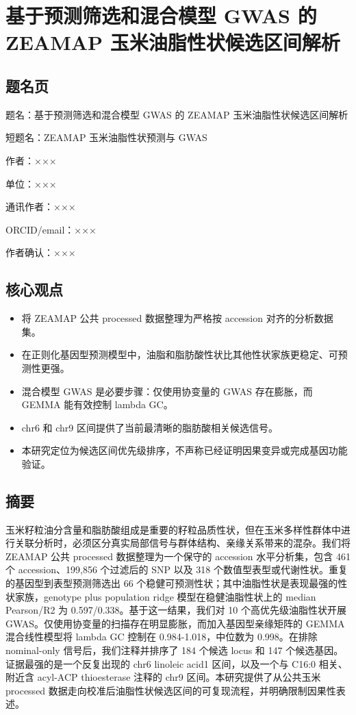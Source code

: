 \documentclass[
]{article}
\author{}
\date{}
\providecommand{\tightlist}{%
  \setlength{\itemsep}{0pt}\setlength{\parskip}{0pt}}
\begin{document}
\section{基于预测筛选和混合模型 GWAS 的 ZEAMAP
玉米油脂性状候选区间解析}\label{ux57faux4e8eux9884ux6d4bux7b5bux9009ux548cux6df7ux5408ux6a21ux578b-gwas-ux7684-zeamap-ux7389ux7c73ux6cb9ux8102ux6027ux72b6ux5019ux9009ux533aux95f4ux89e3ux6790}

\subsection{题名页}\label{ux9898ux540dux9875}

题名：基于预测筛选和混合模型 GWAS 的 ZEAMAP 玉米油脂性状候选区间解析

短题名：ZEAMAP 玉米油脂性状预测与 GWAS

作者：×××

单位：×××

通讯作者：×××

ORCID/email：×××

作者确认：×××

\subsection{核心观点}\label{ux6838ux5fc3ux89c2ux70b9}

\begin{itemize}
\tightlist
\item
  将 ZEAMAP 公共 processed 数据整理为严格按 accession 对齐的分析数据集。
\item
  在正则化基因型预测模型中，油脂和脂肪酸性状比其他性状家族更稳定、可预测性更强。
\item
  混合模型 GWAS 是必要步骤：仅使用协变量的 GWAS 存在膨胀，而 GEMMA
  能有效控制 lambda GC。
\item
  chr6 和 chr9 区间提供了当前最清晰的脂肪酸相关候选信号。
\item
  本研究定位为候选区间优先级排序，不声称已经证明因果变异或完成基因功能验证。
\end{itemize}

\subsection{摘要}\label{ux6458ux8981}

玉米籽粒油分含量和脂肪酸组成是重要的籽粒品质性状，但在玉米多样性群体中进行关联分析时，必须区分真实局部信号与群体结构、亲缘关系带来的混杂。我们将
ZEAMAP 公共 processed 数据整理为一个保守的 accession 水平分析集，包含
461 个 accession、199,856 个过滤后的 SNP 以及 318
个数值型表型或代谢性状。重复的基因型到表型预测筛选出 66
个稳健可预测性状；其中油脂性状是表现最强的性状家族，genotype plus
population ridge 模型在稳健油脂性状上的 median Pearson/R2 为
0.597/0.338。基于这一结果，我们对 10 个高优先级油脂性状开展
GWAS。仅使用协变量的扫描存在明显膨胀，而加入基因型亲缘矩阵的 GEMMA
混合线性模型将 lambda GC 控制在 0.984-1.018，中位数为 0.998。在排除
nominal-only 信号后，我们注释并排序了 184 个候选 locus 和 147
个候选基因。证据最强的是一个反复出现的 chr6 linoleic acid1
区间，以及一个与 C16:0 相关、附近含 acyl-ACP thioesterase 注释的 chr9
区间。本研究提供了从公共玉米 processed
数据走向校准后油脂性状候选区间的可复现流程，并明确限制因果性表述。
\end{document}
